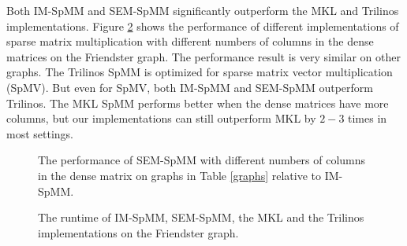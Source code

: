 Both IM-SpMM and SEM-SpMM significantly outperform the MKL and Trilinos implementations.
Figure \ref{perf:spmm} shows the performance of different implementations of
sparse matrix multiplication with different numbers of columns in the dense
matrices on the Friendster graph. The performance result is very similar
on other graphs. The Trilinos SpMM is optimized for sparse matrix vector
multiplication (SpMV). But even for SpMV, both IM-SpMM and SEM-SpMM outperform
Trilinos. The MKL SpMM performs better when the dense matrices have more columns,
but our implementations can still outperform MKL by $2-3$ times in most settings.

\begin{figure}
	\begin{center}
		\footnotesize
		
		\caption{The performance of SEM-SpMM with different numbers of columns
			in the dense matrix on graphs in Table \ref{graphs} relative to IM-SpMM.}
		\label{perf:spmm_comp}
	\end{center}
\end{figure}

\begin{figure}
	\begin{center}
		\footnotesize
		
		\caption{The runtime of IM-SpMM, SEM-SpMM, the MKL and the Trilinos
			implementations on the Friendster graph.}
		\label{perf:spmm}
	\end{center}
\end{figure}

%	
%	

%		
%		


